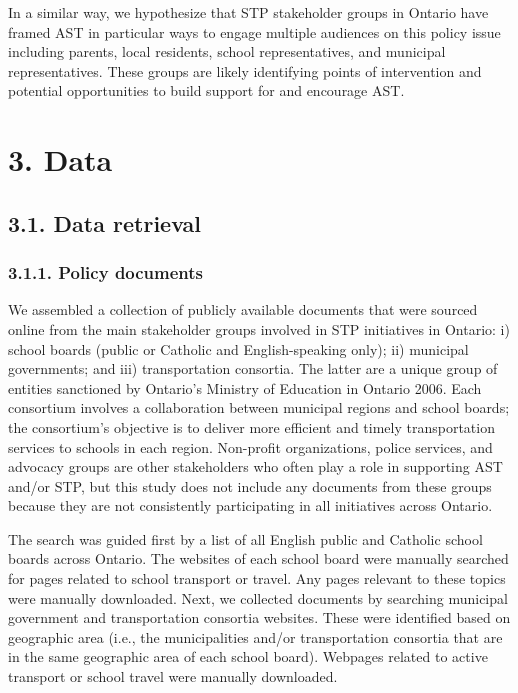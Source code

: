 \documentclass[]{elsarticle} %
\begin{document}
In a similar way, we hypothesize that STP stakeholder groups in Ontario
have framed AST in particular ways to engage multiple audiences on this
policy issue including parents, local residents, school representatives,
and municipal representatives. These groups are likely identifying
points of intervention and potential opportunities to build support for
and encourage AST.

\hypertarget{data}{%
\section{3. Data}\label{data}}

\hypertarget{data-retrieval}{%
\subsection{3.1. Data retrieval}\label{data-retrieval}}

\hypertarget{policy-documents}{%
\subsubsection{3.1.1. Policy documents}\label{policy-documents}}

We assembled a collection of publicly available documents that were
sourced online from the main stakeholder groups involved in STP
initiatives in Ontario: i) school boards (public or Catholic and
English-speaking only); ii) municipal governments; and iii)
transportation consortia. The latter are a unique group of entities
sanctioned by Ontario's Ministry of Education in Ontario 2006. Each
consortium involves a collaboration between municipal regions and school
boards; the consortium's objective is to deliver more efficient and
timely transportation services to schools in each region. Non-profit
organizations, police services, and advocacy groups are other
stakeholders who often play a role in supporting AST and/or STP, but
this study does not include any documents from these groups because they
are not consistently participating in all initiatives across Ontario.

The search was guided first by a list of all English public and Catholic
school boards across Ontario. The websites of each school board were
manually searched for pages related to school transport or travel. Any
pages relevant to these topics were manually downloaded. Next, we
collected documents by searching municipal government and transportation
consortia websites. These were identified based on geographic area
(i.e., the municipalities and/or transportation consortia that are in
the same geographic area of each school board). Webpages related to
active transport or school travel were manually downloaded.
\end{document}
